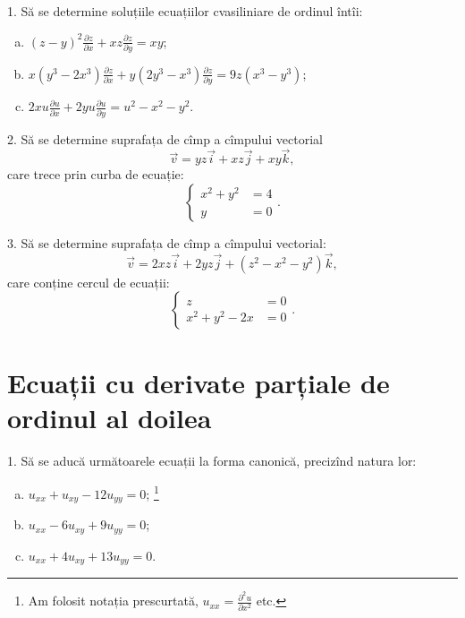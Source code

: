 \documentclass[11pt,a4paper]{article}
\theoremstyle{dotless}
\theoremstyle{dotlessdr}
\begin{document}
1. Să se determine soluțiile ecuațiilor cvasiliniare de ordinul întîi:
\begin{enumerate}[(a)]
\item $ (z - y)^2 \frac{\partial z}{\partial x} + xz \frac{\partial z}{\partial y} = xy $;
\item $ x(y^3 - 2x^3) \frac{\partial z}{\partial x} + y(2y^3 - x^3) %
  \frac{\partial z}{\partial y} = 9z(x^3 - y^3) $;
\item $ 2xu \frac{\partial u}{\partial x} + 2yu\frac{\partial u}{\partial y} = %
  u^2 - x^2 - y^2 $.
\end{enumerate}

\vspace{1cm}

2. Să se determine suprafața de cîmp a cîmpului vectorial
\[
  \vec{v} = yz\vec{i} + xz \vec{j} + xy\vec{k},
\]
care trece prin curba de ecuație:
\[
  \begin{cases}
    x^2 + y^2 &= 4 \\
    y &= 0
  \end{cases}.
\]

\vspace{1cm}

3. Să se determine suprafața de cîmp a cîmpului vectorial:
\[
  \vec{v} = 2xz\vec{i} + 2yz\vec{j} + (z^2 - x^2 - y^2)\vec{k},
\]
care conține cercul de ecuații:
\[
  \begin{cases}
    z &= 0 \\
    x^2 + y^2 - 2x &= 0
  \end{cases}.
\]


\section*{Ecuații cu derivate parțiale de ordinul al doilea}

1. Să se aducă următoarele ecuații la forma canonică, precizînd natura lor:
\begin{enumerate}[(a)]
\item $ u_{xx} + u_{xy} - 12 u_{yy} = 0 $;
  \footnote{Am folosit notația prescurtată, %
    $ u_{xx} = \frac{\partial^2 u}{\partial x^2} $ etc.}
\item $ u_{xx} - 6u_{xy} + 9 u_{yy} = 0 $;
\item $ u_{xx} + 4u_{xy} + 13u_{yy} = 0 $.
\end{enumerate}

\vspace{1cm}
\end{document}
